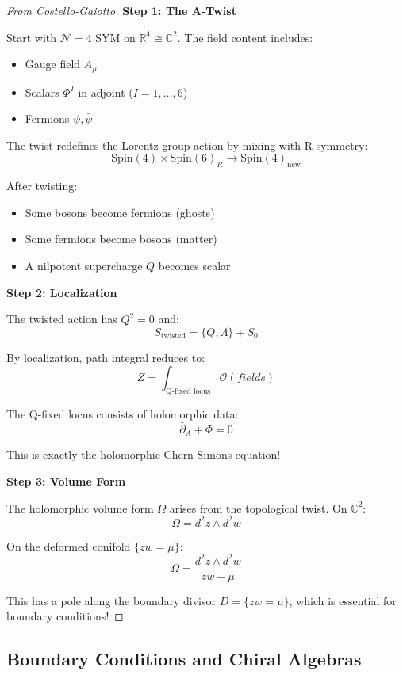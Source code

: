 \begin{proof}[From Costello-Gaiotto]
\textbf{Step 1: The A-Twist}

Start with $\mathcal{N}=4$ SYM on $\mathbb{R}^4 \cong \mathbb{C}^2$. The field 
content includes:
\begin{itemize}
\item Gauge field $A_\mu$
\item Scalars $\Phi^I$ in adjoint ($I=1,\ldots,6$)
\item Fermions $\psi, \bar{\psi}$
\end{itemize}

The twist redefines the Lorentz group action by mixing with R-symmetry:
$$\text{Spin}(4) \times \text{Spin}(6)_R \to \text{Spin}(4)_{\text{new}}$$

After twisting:
\begin{itemize}
\item Some bosons become fermions (ghosts)
\item Some fermions become bosons (matter)
\item A nilpotent supercharge $Q$ becomes scalar
\end{itemize}

\textbf{Step 2: Localization}

The twisted action has $Q^2 = 0$ and:
$$S_{\text{twisted}} = \{Q, \Lambda\} + S_0$$

By localization, path integral reduces to:
$$Z = \int_{\text{Q-fixed locus}} \mathcal{O}(fields)$$

The Q-fixed locus consists of holomorphic data:
$$\bar{\partial}_A + \Phi = 0$$

This is exactly the holomorphic Chern-Simons equation!

\textbf{Step 3: Volume Form}

The holomorphic volume form $\Omega$ arises from the topological twist. On 
$\mathbb{C}^2$:
$$\Omega = d^2z \wedge d^2w$$

On the deformed conifold $\{zw = \mu\}$:
$$\Omega = \frac{d^2z \wedge d^2w}{zw - \mu}$$

This has a pole along the boundary divisor $D = \{zw = \mu\}$, which is 
essential for boundary conditions!
\end{proof}

\subsection{Boundary Conditions and Chiral Algebras}

